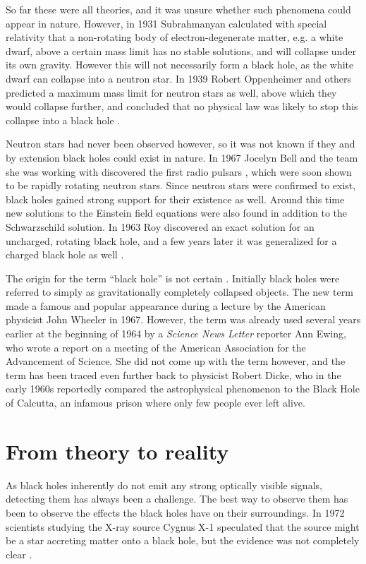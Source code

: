 \documentclass[english, oneside]{HYgradu}
\begin{document}
So far these were all theories, and it was unsure whether such phenomena could appear in nature. However, in 1931 Subrahmanyan \cite{chandrasekhar:1931} calculated with special relativity that a non-rotating body of electron-degenerate matter, e.g. a white dwarf, above a certain mass limit has no stable solutions, and will collapse under its own gravity. However this will not necessarily form a black hole, as the white dwarf can collapse into a neutron star. In 1939 Robert Oppenheimer and others predicted a maximum mass limit for neutron stars as well, above which they would collapse further, and concluded that no physical law was likely to stop this collapse into a black hole \citep{oppenheimer:1939}.

Neutron stars had never been observed however, so it was not known if they and by extension black holes could exist in nature. In 1967 Jocelyn Bell and the team she was working with discovered the first radio pulsars \citep{hewish-bell:1968}, which were soon shown to be rapidly rotating neutron stars. Since neutron stars were confirmed to exist, black holes gained strong support for their existence as well. Around this time new solutions to the Einstein field equations were also found in addition to the Schwarzschild solution. In 1963 Roy \cite{kerr:1963} discovered an exact solution for an uncharged, rotating black hole, and a few years later it was generalized for a charged black hole as well \citep{newman:1965}.

The origin for the term ``black hole'' is not certain \citep{blackholeorigins}. Initially black holes were referred to simply as gravitationally completely collapsed objects. The new term made a famous and popular appearance during a lecture by the American physicist John Wheeler in 1967. However, the term was already used several years earlier at the beginning of 1964 by a \textit{Science News Letter} reporter Ann Ewing, who wrote a report on a meeting of the American Association for the Advancement of Science. She did not come up with the term however, and the term has been traced even further back to physicist Robert Dicke, who in the early 1960s reportedly compared the astrophysical phenomenon to the Black Hole of Calcutta, an infamous prison where only few people ever left alive.

\section{From theory to reality}

As black holes inherently do not emit any strong optically visible signals, detecting them has always been a challenge. The best way to observe them has been to observe the effects the black holes have on their surroundings. In 1972 scientists studying the X-ray source Cygnus X-1 speculated that the source might be a star accreting matter onto a black hole, but the evidence was not completely clear \citep{bolton:1972, webster:1972}.
\end{document}
